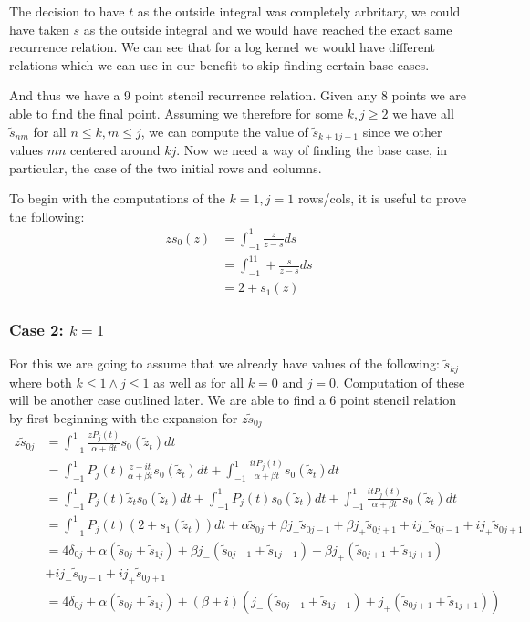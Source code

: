 \documentclass{article}
\begin{document}
The decision to have $t$ as the outside integral was completely arbritary, we could have taken $s$ as the outside integral and we would have reached the exact same recurrence relation.
We can see that for a log kernel we would have different relations which we can use in our benefit to skip finding certain base cases.

And thus we have a 9 point stencil recurrence relation.
Given any 8 points we are able to find the final point.
Assuming we therefore for some $k,j\geq 2$ we have all $\tilde{s}_{nm}$ for all $n\leq k,m\leq j$,
we can compute the value of $\tilde{s}_{k+1j+1}$ since we other values $mn$ centered around $kj$.
Now we need a way of finding the base case, in particular, the case of the two initial rows and columns.

To begin with the computations of the $k=1,j=1$ rows/cols, it is useful to prove the following:
\begin{align}
    zs_0(z)&=\int_{-1}^1\frac{z}{z-s}ds \\
    &= \int_{-1}^11+\frac{s}{z-s}ds\\
    &= 2+s_1(z)
\end{align}

\subsubsection{Case 2: $k=1$}
For this we are going to assume that we already have values of the following: $\tilde{s}_{kj}$ where both $k\leq1 \wedge j\leq1$ as well as for all $k=0$ and $j=0$.
Computation of these will be another case outlined later.
We are able to find a 6 point stencil relation by first beginning with the expansion for $z\tilde{s}_{0j}$
\begin{align}
    z\tilde{s}_{0j}&=\int_{-1}^1\frac{zP_j(t)}{\alpha+\beta t}s_0(\tilde{z}_t)dt\\
    &= \int_{-1}^1P_j(t)\frac{z-it}{\alpha+\beta t}s_0(\tilde{z}_t)dt
    +\int_{-1}^1\frac{itP_j(t)}{\alpha+\beta t}s_0(\tilde{z}_t)dt\\
    &= \int_{-1}^1P_j(t)\tilde{z}_ts_0(\tilde{z}_t)dt
    +\int_{-1}^1P_j(t)s_0(\tilde{z}_t)dt
    +\int_{-1}^1\frac{itP_j(t)}{\alpha+\beta t}s_0(\tilde{z}_t)dt\\
    &= \int_{-1}^1P_j(t)(2+s_1(\tilde{z}_t))dt
    +\alpha \tilde{s}_{0j}+\beta j_-\tilde{s}_{0j-1}+\beta j_+\tilde{s}_{0j+1}
    +i j_-\tilde{s}_{0j-1}+i j_+\tilde{s}_{0j+1}\\
    &=4\delta_{0j}+\alpha(\tilde{s}_{0j}+\tilde{s}_{1j})
    +\beta j_-(\tilde{s}_{0j-1}+\tilde{s}_{1j-1})+\beta j_+(\tilde{s}_{0j+1}+\tilde{s}_{1j+1})\\
    &+i j_-\tilde{s}_{0j-1}+i j_+\tilde{s}_{0j+1} \\
    &=4\delta_{0j}+\alpha(\tilde{s}_{0j}+\tilde{s}_{1j})
    +(\beta+i)(j_-(\tilde{s}_{0j-1}+\tilde{s}_{1j-1})+j_+(\tilde{s}_{0j+1}+\tilde{s}_{1j+1}))
\end{align}
\end{document}
